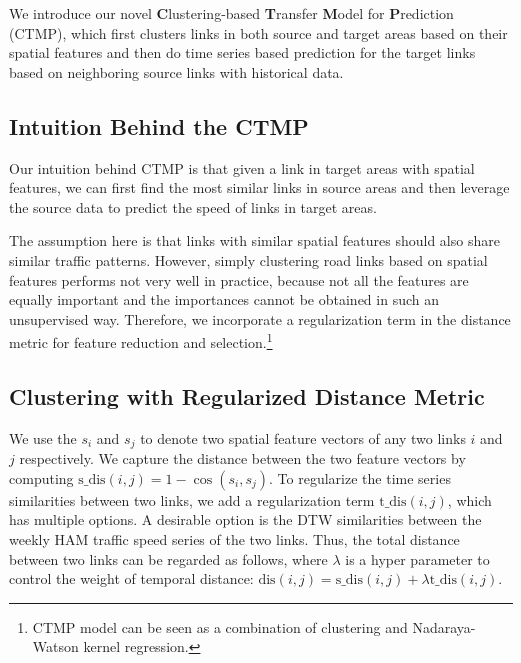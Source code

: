 We introduce our novel \textbf{C}lustering-based \textbf{T}ransfer \textbf{M}odel for \textbf{P}rediction  (CTMP), which first clusters links in both source and target areas based on their spatial features and then do time series based prediction for the target links based on neighboring source links with historical data.

\subsection{Intuition Behind the CTMP}
Our intuition behind CTMP is that given a link in target areas with spatial features, we can first find the most similar links in source areas and then leverage the source data to predict the speed of links in target areas.

The assumption here is that links with similar spatial features should also share similar traffic patterns.
However, simply clustering road links based on spatial features performs not very well in practice, because not all the features are equally important and the importances cannot be obtained in such an unsupervised way.
Therefore, we incorporate a regularization term in the distance metric for feature reduction and selection.\footnote{CTMP model can be seen as a combination of clustering and Nadaraya-Watson kernel regression.}

\subsection{Clustering with Regularized Distance Metric}
We use the $s_i$ and $s_j$ to denote two spatial feature vectors of any two links $i$ and $j$ respectively.
We capture the distance between the two feature vectors by computing $\text{s\_dis}(i,j) = 1-\cos(s_i,s_j)$.
To regularize the time series similarities between two links, we add a regularization term $\text{t\_dis}(i,j)$, which has multiple options.
A desirable option is the DTW \cite{} similarities between the weekly HAM traffic speed series of the two links.
Thus, the total distance between two links can be regarded as follows, where $\lambda$ is a hyper parameter to control the weight of temporal distance:
$\text{dis}(i,j) =  \text{s\_dis}(i,j) + \lambda \text{t\_dis}(i,j) $.

